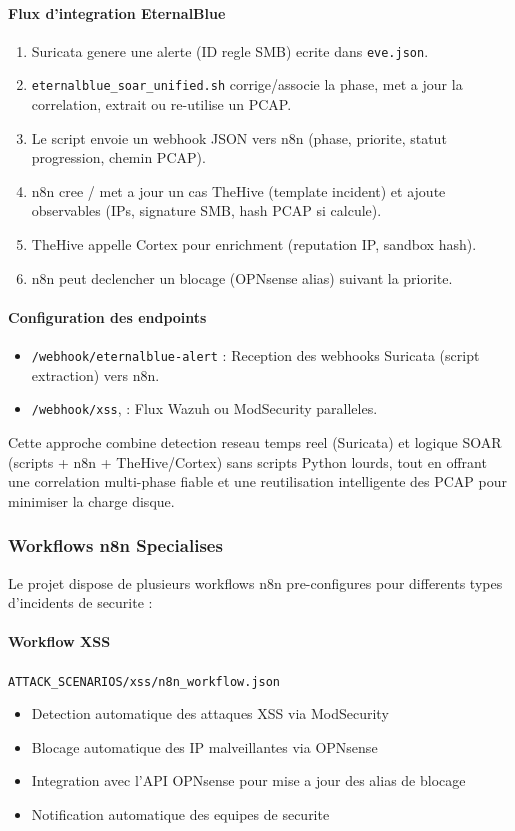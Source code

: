 \paragraph{Flux d'integration EternalBlue}
\begin{enumerate}
  \item Suricata genere une alerte (ID regle SMB) ecrite dans \texttt{eve.json}.
  \item \texttt{eternalblue\_soar\_unified.sh} corrige/associe la phase, met a jour la correlation, extrait ou re-utilise un PCAP.
  \item Le script envoie un webhook JSON vers n8n (phase, priorite, statut progression, chemin PCAP).
  \item n8n cree / met a jour un cas TheHive (template incident) et ajoute observables (IPs, signature SMB, hash PCAP si calcule).
  \item TheHive appelle Cortex pour enrichment (reputation IP, sandbox hash).
  \item n8n peut declencher un blocage (OPNsense alias) suivant la priorite.
\end{enumerate}

\paragraph{Configuration des endpoints}
\begin{itemize}
  \item \texttt{/webhook/eternalblue-alert} : Reception des webhooks Suricata (script extraction) vers n8n.
  \item \texttt{/webhook/xss}, : Flux Wazuh ou ModSecurity paralleles.
\end{itemize}

Cette approche combine detection reseau temps reel (Suricata) et logique SOAR (scripts + n8n + TheHive/Cortex) sans scripts Python lourds, tout en offrant une correlation multi-phase fiable et une reutilisation intelligente des PCAP pour minimiser la charge disque.

\subsubsection{Workflows n8n Specialises}

Le projet dispose de plusieurs workflows n8n pre-configures pour differents types d'incidents de securite :

\paragraph{Workflow XSS}
\texttt{ATTACK\_SCENARIOS/xss/n8n\_workflow.json}
\begin{itemize}
  \item Detection automatique des attaques XSS via ModSecurity
  \item Blocage automatique des IP malveillantes via OPNsense
  \item Integration avec l'API OPNsense pour mise a jour des alias de blocage
  \item Notification automatique des equipes de securite
\end{itemize}

